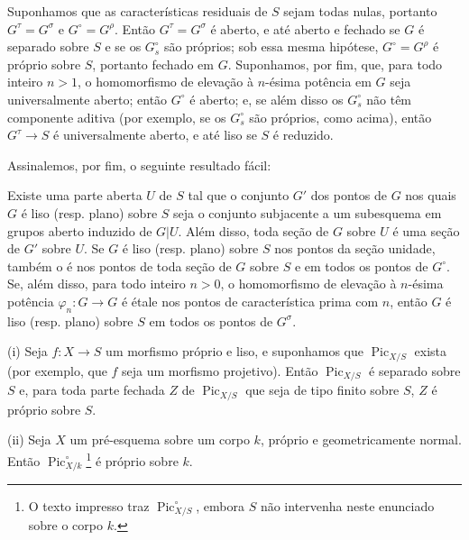  Suponhamos que as características residuais de $S$
sejam todas nulas, portanto $G^\tau=G^\sigma$ e $G^\circ=G^\rho$. Então
$G^\tau=G^\sigma$ é aberto, e até aberto e fechado se $G$ é separado sobre $S$
e se os $G_s^\circ$ são próprios; sob essa mesma hipótese, $G^\circ=G^\rho$ é
próprio sobre $S$, portanto fechado em $G$. Suponhamos, por fim, que, para todo
inteiro $n>1$, o homomorfismo de elevação à $n$-ésima potência em $G$ seja
universalmente aberto; então $G^\circ$ é aberto; e, se além disso os
$G_s^\circ$ não têm componente aditiva (por exemplo, se os $G_s^\circ$ são
próprios, como acima), então $G^\tau\longrightarrow S$ é universalmente aberto,
e até liso se $S$ é reduzido.

Assinalemos, por fim, o seguinte resultado fácil:

 Existe uma parte aberta $U$ de $S$ tal que o conjunto
$G'$ dos pontos de $G$ nos quais $G$ é liso (resp. plano) sobre $S$ seja o
conjunto subjacente a um subesquema em grupos aberto induzido de $G|U$. Além
disso, toda seção de $G$ sobre $U$ é uma seção de $G'$ sobre $U$.
 Se $G$ é liso (resp. plano) sobre $S$ nos pontos da
seção unidade, também o é nos pontos de toda seção de $G$
sobre $S$ e em todos os pontos de $G^\circ$. Se, além disso, para todo inteiro
$n>0$, o homomorfismo de elevação à $n$-ésima potência
$\varphi_n:G\longrightarrow G$ é étale nos pontos de característica prima com
$n$, então $G$ é liso (resp. plano) sobre $S$ em todos os pontos de $G^\sigma$.



\noindent(i) Seja $f:X\longrightarrow S$ um morfismo próprio e liso, e
suponhamos que $\operatorname{Pic}_{X/S}$ exista (por exemplo, que $f$ seja um
morfismo projetivo). Então $\operatorname{Pic}_{X/S}$ é separado sobre $S$ e,
para toda parte fechada $Z$ de $\operatorname{Pic}_{X/S}$ que seja de tipo
finito sobre $S$, $Z$ é próprio sobre $S$.

\noindent(ii) Seja $X$ um pré-esquema sobre um corpo $k$, próprio e
geometricamente normal. Então $\operatorname{Pic}_{X/k}^\circ$\footnote{O texto
impresso traz $\operatorname{Pic}_{X/S}^\circ$, embora $S$ não intervenha neste
enunciado sobre o corpo $k$.} é próprio sobre $k$.

